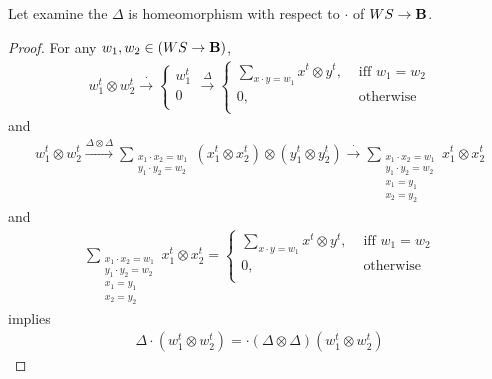 \begin{example}
Let examine the $\Delta$ is homeomorphism with respect to 
$\cdot$ of $WS\to{\mathbf{B}}$.
\begin{proof}
For any $w_1,w_2\in (WS \to {\mathbf{B}})$,
\begin{equation}\begin{split}
	w_1^t \otimes w_2^t \xrightarrow{\cdot} \begin{cases}
			w_1^t \\
			0 \\
		\end{cases} \xrightarrow{\Delta} \begin{cases}
			\sum_{x\cdot y = w_1} x^t \otimes y^t, &\text{ iff } w_1 = w_2 \\
			0, &\text{ otherwise } \\
		\end{cases}
\end{split}\end{equation}
and
\begin{equation}\begin{split}
	w_1^t \otimes w_2^t \xrightarrow{\Delta \otimes \Delta} 
		\sum_{\substack{x_1\cdot x_2=w_1\\y_1\cdot y_2=w_2}} 
			(x_1^t \otimes x_2^t) \otimes (y_1^t \otimes y_2^t) 
		\xrightarrow{\cdot} 
		\sum_{\substack{x_1\cdot x_2=w_1\\y_1\cdot y_2=w_2\\x_1=y_1\\x_2=y_2}} 
			x_1^t \otimes x_2^t
\end{split}\end{equation}
and
\begin{equation}\begin{split}
	\sum_{\substack{x_1\cdot x_2=w_1\\y_1\cdot y_2=w_2\\x_1=y_1\\x_2=y_2}} x_1^t \otimes x_2^t
		= \begin{cases}
			\sum_{x\cdot y = w_1} x^t \otimes y^t, &\text{ iff } w_1 = w_2 \\
			0, &\text{ otherwise } \\
		\end{cases}
\end{split}\end{equation}
implies
\begin{equation}\begin{split}
	\Delta \cdot (w_1^t \otimes w_2^t) = \cdot (\Delta \otimes \Delta) (w_1^t \otimes w_2^t)
\end{split}\end{equation}
\end{proof}
\end{example}

